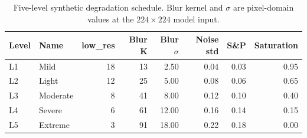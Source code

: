 \begin{table}[htbp]
\centering
\caption{Five-level synthetic degradation schedule. Blur kernel and $\sigma$ are pixel-domain values at the $224 \times 224$ model input.}
\label{tab:levels}
\setlength{\tabcolsep}{4pt}
\renewcommand{\arraystretch}{1.1}
\begin{tabular}{llrrrrrr}
\toprule
Level & Name & low\_res & Blur K & Blur $\sigma$ & Noise std & S\&P & Saturation \\
\midrule
L1 & Mild & 18 & 13 & 2.50 & 0.04 & 0.03 & 0.95 \\
L2 & Light & 12 & 25 & 5.00 & 0.08 & 0.06 & 0.65 \\
L3 & Moderate & 8 & 41 & 8.00 & 0.12 & 0.10 & 0.40 \\
L4 & Severe & 6 & 61 & 12.00 & 0.16 & 0.14 & 0.15 \\
L5 & Extreme & 3 & 91 & 18.00 & 0.22 & 0.18 & 0.00 \\
\bottomrule
\end{tabular}
\end{table}
